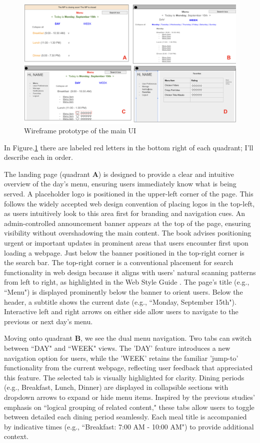 \documentclass[10pt,twocolumn]{article}
\begin{document}
    \begin{figure}
    \centering
    \includegraphics[width=1.0\linewidth]{images/prototype2.png} %
    \caption{
         Wireframe prototype of the main UI
    }\label{prototypes}
\end{figure}




In Figure.\ref{prototypes} there are labeled red letters in the bottom right of each quadrant; I'll describe each in order.

The landing page (quadrant \textbf{A}) is designed to provide a clear and intuitive overview of the day's menu, ensuring users immediately know what is being served. A placeholder logo is positioned in the upper-left corner of the page. This follows the widely accepted web design convention of placing logos in the top-left, as users intuitively look to this area first for branding and navigation cues. An admin-controlled announcement banner appears at the top of the page, ensuring visibility without overshadowing the main content. The book advises positioning urgent or important updates in prominent areas that users encounter first upon loading a webpage. Just below the banner positioned in the top-right corner is the search bar. The top-right corner is a conventional placement for search functionality in web design because it aligns with users' natural scanning patterns from left to right, as highlighted in the Web Style Guide \cite{Web2009}. The page's title (e.g., ``Menu") is displayed prominently below the banner to orient users. Below the header, a subtitle shows the current date (e.g., ``Monday, September 15th"). Interactive left and right arrows on either side allow users to navigate to the previous or next day’s menu. 

Moving onto quadrant \textbf{B}, we see the dual menu navigation. Two tabs can switch between ``DAY" and ``WEEK" views. The 'DAY' feature introduces a new navigation option for users, while the 'WEEK' retains the familiar 'jump-to' functionality from the current webpage, reflecting user feedback that appreciated this feature. The selected tab is visually highlighted for clarity. Dining periods (e.g., Breakfast, Lunch, Dinner) are displayed in collapsible sections with dropdown arrows to expand or hide menu items. Inspired by the previous studies' emphasis on ``logical grouping of related content," these tabs allow users to toggle between detailed each dining period seamlessly. Each meal title is accompanied by indicative times (e.g., ``Breakfast: 7:00 AM - 10:00 AM") to provide additional context.
\end{document}

